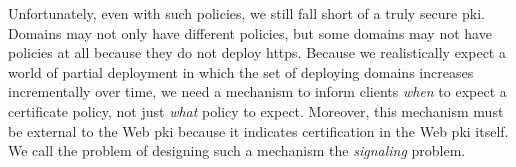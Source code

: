 
Unfortunately, even with such policies, we still fall short of a truly secure
\ac{pki}. Domains may not only have different policies, but some domains may not
have policies at all because they do not deploy \ac{https}. Because we
realistically expect a world of partial deployment in which the set of deploying
domains increases incrementally over time, we need a mechanism to inform clients
\emph{when} to expect a certificate policy, not just \emph{what} policy to
expect. Moreover, this mechanism must be external to the Web \ac{pki} because it
indicates certification in the Web \ac{pki} itself. We call the problem of
designing such a mechanism the \emph{signaling} problem.


